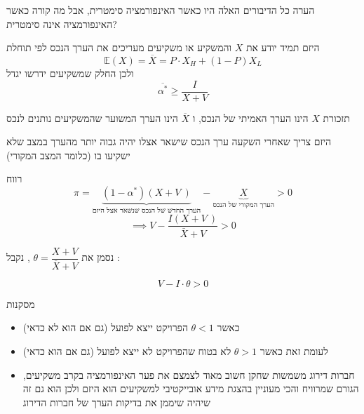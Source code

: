 \documentclass[usenames,dvipsnames, 10pt]{beamer}
\begin{document}
\begin{RTL}
\begin{frame}[allowframebreaks]
    \framebreak
    \begin{alertblock}{הערה}
    כל הדיבורים האלה היו כאשר האינפורמציה סימטרית, אבל מה קורה כאשר האינפורמציה אינה סימטרית?
        
    \end{alertblock}
   היזם תמיד יודע את $X$ והמשקיע או משקיעים מעריכים את הערך הנכס לפי תוחלת
   $$\mathbb{E}(X ) = \overline{X} = P \cdot X_H + \left(1-P\right) X_L $$
   ולכן החלק שמשקיעים ידרשו יגדל
    $$\overline{\alpha^*} \geq \frac{I}{X+V}$$

    \begin{alertblock}{תזכורת}
        $X$ הינו הערך האמיתי של הנכס, ו $\overline X$ הינו הערך המשוער שהמשקיעים נותנים לנכס
    \end{alertblock}
    \framebreak
    היזם צריך שאחרי השקעה ערך הנכס שישאר אצלו יהיה גבוה יותר מהערך במצב שלא ישקיעו בו (כלומר המצב המקורי)
    \begin{block}{רווח}
        $$\pi = \underbrace{(1-\alpha^*)\left(X +V \ \right)}_{\text{הערך החדש של הנכס שנשאר אצל היזם}} - \underbrace{X}_{\text{הערך המקורי של הנכס}} > 0 $$
        $$ \implies V - \frac{I \left(X + V \ \right)}{\bar X + V} > 0$$

        נסמן את $\theta = \dfrac{X+V}{\overline{X} + V}$ , נקבל :

        $$ V - I \cdot \theta > 0$$ 
    \end{block}
    \framebreak
    \begin{exampleblock}{מסקנות}
    \begin{itemize}
        \item כאשר $\theta < 1$ הפרויקט ייצא לפועל  (גם אם הוא לא כדאי) 
        \item לעומת זאת כאשר $\theta > 1$  לא בטוח שהפרויקט לא ייצא לפועל (גם אם הוא כדאי)
        \item חברות דירוג משמשות שחקן חשוב מאוד לצמצם את פער האינפורמציה בקרב משקיעים, הגורם שמרוויח והכי מעוניין בהצגת מידע אובייקטיבי למשקיעים הוא היזם ולכן הוא גם זה שיהיה שיממן את בדיקות הערך של חברות הדירוג
    \end{itemize}

	
\end{exampleblock}
\end{frame}
\end{RTL}
\end{document}
